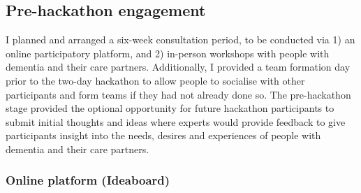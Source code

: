 \pagebreak
\subsection{Pre-hackathon engagement}
\label{sec:EventPrehackathon}
I planned and arranged a six-week consultation period, to be conducted via 1) an online participatory platform, and 2) in-person workshops with people with dementia and their care partners. Additionally, I provided a team formation day prior to the two-day hackathon to allow people to socialise with other participants and form teams if they had not already done so. The pre-hackathon stage provided the optional opportunity for future hackathon participants to submit initial thoughts and ideas where experts would provide feedback to give participants insight into the needs, desires and experiences of people with dementia and their care partners. 

\subsubsection{Online platform (Ideaboard)}
\label{sec:Ideaboard}

